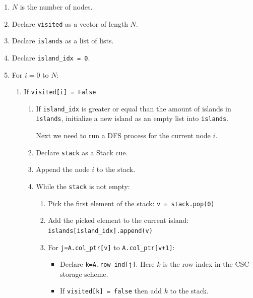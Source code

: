 \documentclass[nols,a4paper,twoside,notoc,fleqn]{tufte-book}
\begin{document}

\begin{enumerate}
	\item $N$ is the number of nodes.
	\item Declare \verb|visited| as a vector of length $N$.
	\item Declare \verb|islands| as a list of lists.
	\item Declare \verb|island_idx = 0|.
	\item For $i=0$ to $N$:
	
	\begin{enumerate}
		\item If \verb|visited[i] = False|
		
		\begin{enumerate}
			\item If \verb|island_idx| is greater or equal than the amount of islands in \verb|islands|, initialize a new island as an empty list into \verb|islands|.
			
			Next we need to run a DFS process for the current node $i$.
			
			\item Declare \verb|stack| as a Stack cue.
			\item Append the node $i$ to the stack.
			
			\item While the \verb|stack| is not empty:
			
			\begin{enumerate}
				\item Pick the first element of the stack: \verb|v = stack.pop(0)|
				
				\item Add the picked element to the current island: \verb|islands[island_idx].append(v)|
				
				\item For \verb|j=A.col_ptr[v]| to \verb|A.col_ptr[v+1]|:
				
				\begin{itemize}
					\item Declare \verb|k=A.row_ind[j]|. Here $k$ is the row index in the CSC storage scheme.
					
					\item If \verb|visited[k] = false| then add $k$ to the stack.
				\end{itemize}
				

\end{enumerate}
\end{enumerate}
\end{enumerate}
\end{enumerate}
\end{document}
